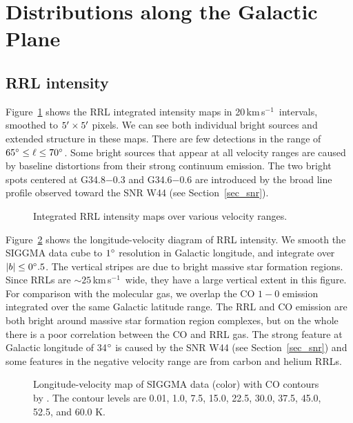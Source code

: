\documentclass[manuscript]{aastex61}
\newcommand{\kms}{\,km\,s$^{-1}$}
\begin{document}
\section{Distributions along the Galactic Plane} \label{sec_gal}
\subsection{RRL intensity} \label{sec_gal_rrl}
Figure~\ref{fig_rrl_map} shows the RRL integrated intensity maps in 20\kms\ intervals, smoothed to $5\mbox{$^\prime$} \times 5\mbox{$^\prime$}$ pixels.
We can see both individual bright sources and extended structure in these maps.
There are few detections in the range of $65\mbox{$^\circ$} \leq \ell \leq  70\mbox{$^\circ$}$. 
Some bright sources that appear at all velocity ranges are caused by baseline distortions from their strong continuum emission.
The two bright spots centered at G34.8$-$0.3 and G34.6$-$0.6 are introduced by the broad line profile observed toward the SNR W44 (see Section~\ref{sec_snr}).

\begin{figure}[htbp]
\caption{Integrated RRL intensity maps over various velocity ranges.
}\label{fig_rrl_map}
\end{figure}

Figure~\ref{lv_map} shows the longitude-velocity diagram of RRL intensity.
We smooth the SIGGMA data cube to $1\mbox{$^\circ$}$ resolution in Galactic longitude, and integrate over $|b| \leq 0\mbox{$^\circ$}.5$.
The vertical stripes are due to bright massive star formation regions.  Since RRLs are $\sim25$\kms\ wide, they have a large vertical extent in this figure.
For comparison with the molecular gas, we overlap the CO $1-0$ emission \citep{Dame2001} integrated over the same Galactic latitude range.
The RRL and CO emission are both bright around massive star formation region complexes, but on the whole there is a poor correlation between the CO and RRL gas.
The strong feature at Galactic longitude of 34$\mbox{$^\circ$}$ is caused by the SNR W44 (see Section~\ref{sec_snr}) and some features in the negative velocity range are from carbon and helium RRLs.
\begin{figure}[htbp]
\centering
{}
\caption{Longitude-velocity map of  SIGGMA data (color) with CO contours by \citep{Dame2001}. The contour levels are 0.01, 1.0, 7.5, 15.0, 22.5, 30.0, 37.5, 45.0, 52.5, and 60.0 K.}\label{lv_map}
\end{figure}
\end{document}
